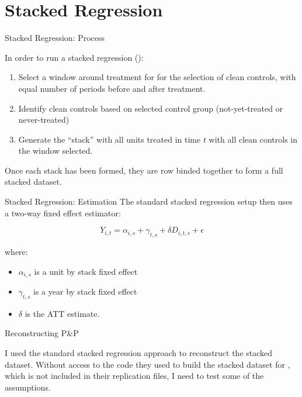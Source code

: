 \documentclass[11pt]{beamer}
\begin{document}
\section{Stacked Regression}

\begin{frame}{Stacked Regression: Process}

In order to run a stacked regression (\cite{cengiz2019effect}):

\begin{enumerate}
    \item Select a window around treatment for for the selection of clean controls, with equal number of periods before and after treatment.
    \item Identify clean controls based on selected control group (not-yet-treated or never-treated)
    \item Generate the ``stack'' with all units treated in time $t$ with all clean controls in the window selected.
\end{enumerate}

Once each stack has been formed, they are row binded together to form a full stacked dataset.
    
\end{frame}

\begin{frame}{Stacked Regression: Estimation}
    The standard stacked regression setup then uses a two-way fixed effect estimator:

    \begin{equation}
        Y_{i,t} = \alpha_{i,s} + \gamma_{t,s} + \delta D_{i,t,s} + \epsilon
    \end{equation}

    where: 
    
    \begin{itemize}
        \item $\alpha_{i,s}$ is a unit by stack fixed effect
        \item $\gamma_{t,s}$ is a year by stack fixed effect
        \item $\delta$ is the ATT estimate.
    \end{itemize}
\end{frame}

\begin{frame}{Reconstructing P\&P}

I used the standard stacked regression approach to reconstruct the stacked dataset. Without access to the code they used to build the stacked dataset for \cite{payson2023resreq}, which is not included in their replication files, I need to test some of the assumptions.
    
\end{frame}
\end{document}
